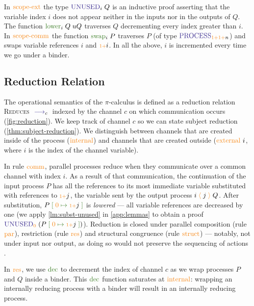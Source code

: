 \documentclass[a4paper,UKenglish,cleveref,autoref,thm-restate,authorcolumns]{lipics-v2019}
\theoremstyle{definition}
\newcommand{\picalc}{$\pi$-calculus}
\newcommand{\type}[1]{\textcolor{BlueViolet}{\operatorname{#1}}}
\newcommand{\constr}[1]{\textcolor{BurntOrange}{\operatorname{#1}}}
\newcommand{\func}[1]{\textcolor{OliveGreen}{\operatorname{#1}}}
\newcommand{\send}[2]{#1 \; \constr{\langle} \; #2 \;\constr{\rangle} \;}
\newcommand{\suc}{\constr{\scriptstyle 1+}}
\newcommand{\subst}[3]{#1 \; \func{[} \; #3 \; \func{\mapsto} \;#2 \; \func{]}}
\newcommand{\reduce}[1]{\; \type{\longrightarrow}_{#1} \;}
\newcommand{\Process}{\type{PROCESS}}
\newcommand{\Unused}{\type{UNUSED}}
\begin{document}
In $\constr{scope-ext}$ the type $\Unused_i \; Q$ is an inductive proof asserting that the variable index $i$ does not appear neither in the inputs nor in the outputs of $Q$.
The function $\func{lower}_i \; Q \; uQ$ traverses $Q$ decrementing every index greater than $i$.
In $\constr{scope-comm}$ the function $\func{swap}_i \; P$ traverses $P$ (of type $\Process_{\suc \suc n}$) and swaps variable references $i$ and $\suc i$.
In all the above, $i$ is incremented every time we go under a binder.
  
\subsection{Reduction Relation}
\label{operational-semantics}

The operational semantics of the \picalc{} is defined as a reduction relation \textsc{Reduces} $\reduce{c}$ indexed by the channel $c$ on which communication occurs (\autoref{fig:reduction}).
We keep track of channel $c$ so we can state subject reduction (\autoref{thm:subject-reduction}).
We distinguish between channels that are created inside of the process ($\constr{internal}$) and channels that are created outside ($\constr{external}\ i$, where $i$ is the index of the channel variable).

In rule $\constr{comm}$, parallel processes reduce when they communicate over a common channel with index ${i}$.
As a result of that communication, the continuation of the input process $P$ has all the references to its most immediate variable substituted with references to $\suc j$, the variable sent by the output process $\send{i}{j}{Q}$.
After substitution, $\subst{P}{\suc j}{\constr{0}}$ is \emph{lowered} --- all variable references are decreased by one (we apply \autoref{lm:subst-unused} in \autoref{app:lemmas} to obtain a proof $\Unused_{\constr{0}} \; (\subst{P}{\suc j}{\constr{0}})$).
Reduction is closed under parallel composition (rule $\constr{par}$), restriction (rule $\constr{res}$) and structural congruence (rule $\constr{struct}$) 
--- notably, not under input nor output, as doing so would not preserve the sequencing of actions \cite{Sangio01}.


In $\constr{res}$, we use $\func{dec}$ to decrement the index of channel $c$ as we wrap processes $P$ and $Q$ inside a binder.
This $\func{dec}$ function saturates at $\constr{internal}$: wrapping an internally reducing process with a binder will result in an internally reducing process.
\end{document}
